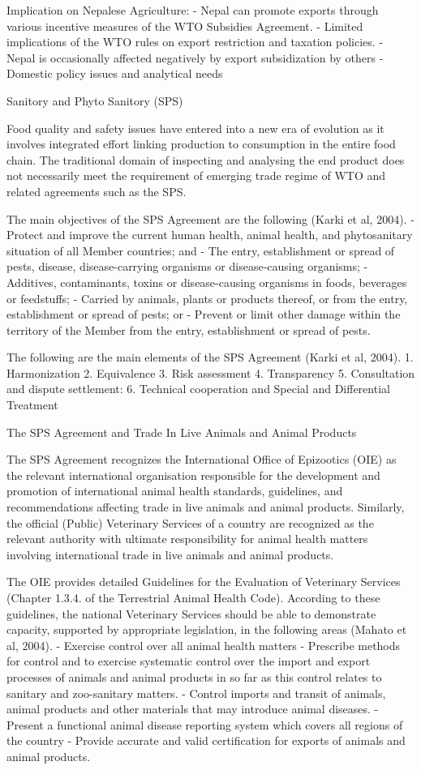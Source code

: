 \documentclass[
  openany]{book}
\begin{document}
Implication on Nepalese Agriculture:
- Nepal can promote exports through various incentive measures of the WTO Subsidies Agreement.
- Limited implications of the WTO rules on export restriction and taxation policies.
- Nepal is occasionally affected negatively by export subsidization by others
- Domestic policy issues and analytical needs

Sanitory and Phyto Sanitory (SPS)

Food quality and safety issues have entered into a new era of evolution as it involves integrated effort linking production to consumption in the entire food chain. The traditional domain of inspecting and analysing the end product does not necessarily meet the requirement of emerging trade regime of WTO and related agreements such as the SPS.

The main objectives of the SPS Agreement are the following (Karki et al, 2004).
- Protect and improve the current human health, animal health, and phytosanitary situation of all Member countries; and
- The entry, establishment or spread of pests, disease, disease-carrying organisms or disease-causing organisms;
- Additives, contaminants, toxins or disease-causing organisms in foods, beverages or feedstuffs;
- Carried by animals, plants or products thereof, or from the entry, establishment or spread of pests; or
- Prevent or limit other damage within the territory of the Member from the entry, establishment or spread of pests.

The following are the main elements of the SPS Agreement (Karki et al, 2004).
1. Harmonization
2. Equivalence
3. Risk assessment
4. Transparency
5. Consultation and dispute settlement:
6. Technical cooperation and Special and Differential Treatment

The SPS Agreement and Trade In Live Animals and Animal Products

The SPS Agreement recognizes the International Office of Epizootics (OIE) as the relevant international organisation responsible for the development and promotion of international animal health standards, guidelines, and recommendations affecting trade in live animals and animal products. Similarly, the official (Public) Veterinary Services of a country are recognized as the relevant authority with ultimate responsibility for animal health matters involving international trade in live animals and animal products.

The OIE provides detailed Guidelines for the Evaluation of Veterinary Services (Chapter 1.3.4. of the Terrestrial Animal Health Code). According to these guidelines, the national Veterinary Services should be able to demonstrate capacity, supported by appropriate legislation, in the following areas (Mahato et al, 2004).
- Exercise control over all animal health matters
- Prescribe methods for control and to exercise systematic control over the import and export processes of animals and animal products in so far as this control relates to sanitary and zoo-sanitary matters.
- Control imports and transit of animals, animal products and other materials that may introduce animal diseases.
- Present a functional animal disease reporting system which covers all regions of the country
- Provide accurate and valid certification for exports of animals and animal products.
\end{document}
